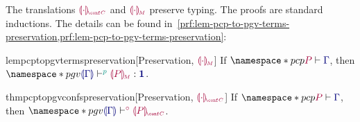 \documentclass[main.tex]{subfiles}
\begin{document}
The translations $\tm{\cpgvC{\cdot}}$ and $\tm{\cpgvM{\cdot}}$ preserve typing. The proofs are standard inductions. The details can be found in~\cref{prf:lem-pcp-to-pgv-terms-preservation,prf:lem-pcp-to-pgv-terms-preservation}:
\begin{compacttheorems}
  \begin{restatablelemma}{lempcptopgvtermspreservation}[Preservation, ${\tm{\cpgvM{\cdot}}}$]
    \label{lem:pcp-to-pgv-terms-preservation}
    If $\pcp{\seq{P}{\ty{\Gamma}}}$, then $\pgv{\tseq[\cs{p}]{\ty{\cpgvT{\Gamma}}}{\cpgvM{P}}{\tyunit}}$.
  \end{restatablelemma}
  \begin{restatabletheorem}{thmpcptopgvconfspreservation}[Preservation, ${\tm{\cpgvC{\cdot}}}$]
    \label{thm:pcp-to-pgv-confs-preservation}
    If $\pcp{\seq{P}{\ty{\Gamma}}}$, then $\pgv{\cseq[\child]{\ty{\cpgvT{\Gamma}}}{\cpgvC{P}}}$.
  \end{restatabletheorem}
\end{compacttheorems}
\end{document}
